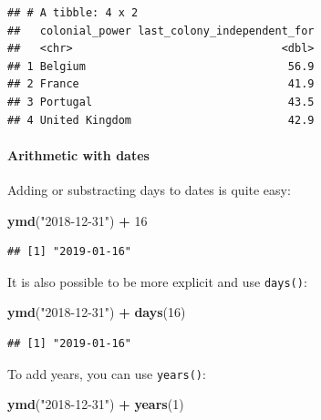 \documentclass[]{gitbook}
\newenvironment{Shaded}{\begin{snugshade}}{\end{snugshade}}
\newcommand{\DecValTok}[1]{\textcolor[rgb]{0.00,0.00,0.81}{#1}}
\newcommand{\KeywordTok}[1]{\textcolor[rgb]{0.13,0.29,0.53}{\textbf{#1}}}
\newcommand{\NormalTok}[1]{#1}
\newcommand{\OperatorTok}[1]{\textcolor[rgb]{0.81,0.36,0.00}{\textbf{#1}}}
\newcommand{\StringTok}[1]{\textcolor[rgb]{0.31,0.60,0.02}{#1}}
\let\oldparagraph\paragraph
\renewcommand{\paragraph}[1]{\oldparagraph{#1}\mbox{}}
\begin{document}
\begin{verbatim}
## # A tibble: 4 x 2
##   colonial_power last_colony_independent_for
##   <chr>                                <dbl>
## 1 Belgium                               56.9
## 2 France                                41.9
## 3 Portugal                              43.5
## 4 United Kingdom                        42.9
\end{verbatim}

\hypertarget{arithmetic-with-dates}{%
\paragraph{Arithmetic with dates}\label{arithmetic-with-dates}}

Adding or substracting days to dates is quite easy:

\begin{Shaded}
\begin{Highlighting}[]
\KeywordTok{ymd}\NormalTok{(}\StringTok{"2018-12-31"}\NormalTok{) }\OperatorTok{+}\StringTok{ }\DecValTok{16}
\end{Highlighting}
\end{Shaded}

\begin{verbatim}
## [1] "2019-01-16"
\end{verbatim}

It is also possible to be more explicit and use \texttt{days()}:

\begin{Shaded}
\begin{Highlighting}[]
\KeywordTok{ymd}\NormalTok{(}\StringTok{"2018-12-31"}\NormalTok{) }\OperatorTok{+}\StringTok{ }\KeywordTok{days}\NormalTok{(}\DecValTok{16}\NormalTok{)}
\end{Highlighting}
\end{Shaded}

\begin{verbatim}
## [1] "2019-01-16"
\end{verbatim}

To add years, you can use \texttt{years()}:

\begin{Shaded}
\begin{Highlighting}[]
\KeywordTok{ymd}\NormalTok{(}\StringTok{"2018-12-31"}\NormalTok{) }\OperatorTok{+}\StringTok{ }\KeywordTok{years}\NormalTok{(}\DecValTok{1}\NormalTok{)}
\end{Highlighting}
\end{Shaded}
\end{document}
